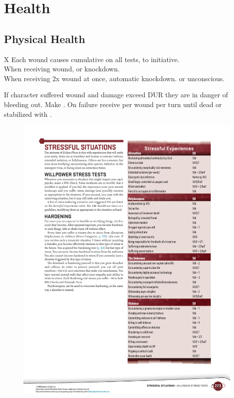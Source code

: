 
\section*{Health}

\subsection*{Physical Health}

\begin{eptable}{ X }
   Each wound causes cumulative  on all tests,  to initiative.\\
   When receiving wound,  or knockdown.\\
   When receiving 2x wound at once, automatic knockdown.  or unconscious.\\
\end{eptable}

\begin{itemize}
    \itembox If character suffered wound and damage exceed DUR they are in
            danger of bleeding out. Make . On failure receive
             per wound per turn until dead or stabilized with .
\end{itemize}

\bigskip

\begin{figure}[htbp!]%
   \includegraphics[scale=0.82]{gfx/health-stress}%
\end{figure}%

